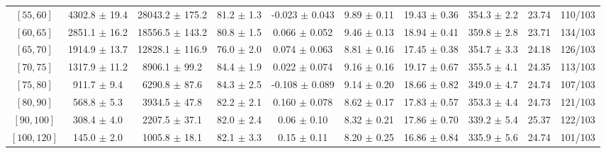 \begin{tabular}{c||c|c|c|c|c|c|c||c|c}
$[55, 60]$ & 4302.8 $\pm$ 19.4 & 28043.2 $\pm$ 175.2 & 81.2 $\pm$ 1.3 & -0.023 $\pm$ 0.043 & 9.89 $\pm$ 0.11 & 19.43 $\pm$ 0.36 & 354.3 $\pm$ 2.2 & 23.74 & 110/103\\
$[60, 65]$ & 2851.1 $\pm$ 16.2 & 18556.5 $\pm$ 143.2 & 80.8 $\pm$ 1.5 & 0.066 $\pm$ 0.052 & 9.46 $\pm$ 0.13 & 18.94 $\pm$ 0.41 & 359.8 $\pm$ 2.8 & 23.71 & 134/103\\
$[65, 70]$ & 1914.9 $\pm$ 13.7 & 12828.1 $\pm$ 116.9 & 76.0 $\pm$ 2.0 & 0.074 $\pm$ 0.063 & 8.81 $\pm$ 0.16 & 17.45 $\pm$ 0.38 & 354.7 $\pm$ 3.3 & 24.18 & 126/103\\
$[70, 75]$ & 1317.9 $\pm$ 11.2 & 8906.1 $\pm$ 99.2 & 84.4 $\pm$ 1.9 & 0.022 $\pm$ 0.074 & 9.16 $\pm$ 0.16 & 19.17 $\pm$ 0.67 & 355.5 $\pm$ 4.1 & 24.35 & 113/103\\
$[75, 80]$ & 911.7 $\pm$ 9.4 & 6290.8 $\pm$ 87.6 & 84.3 $\pm$ 2.5 & -0.108 $\pm$ 0.089 & 9.14 $\pm$ 0.20 & 18.66 $\pm$ 0.82 & 349.0 $\pm$ 4.7 & 24.74 & 107/103\\
$[80, 90]$ & 568.8 $\pm$ 5.3 & 3934.5 $\pm$ 47.8 & 82.2 $\pm$ 2.1 & 0.160 $\pm$ 0.078 & 8.62 $\pm$ 0.17 & 17.83 $\pm$ 0.57 & 353.3 $\pm$ 4.4 & 24.73 & 121/103\\
$[90, 100]$ & 308.4 $\pm$ 4.0 & 2207.5 $\pm$ 37.1 & 82.0 $\pm$ 2.4 & 0.06 $\pm$ 0.10 & 8.32 $\pm$ 0.21 & 17.86 $\pm$ 0.70 & 339.2 $\pm$ 5.4 & 25.37 & 122/103\\
$[100, 120]$ & 145.0 $\pm$ 2.0 & 1005.8 $\pm$ 18.1 & 82.1 $\pm$ 3.3 & 0.15 $\pm$ 0.11 & 8.20 $\pm$ 0.25 & 16.86 $\pm$ 0.84 & 335.9 $\pm$ 5.6 & 24.74 & 101/103\\
\end{tabular}
